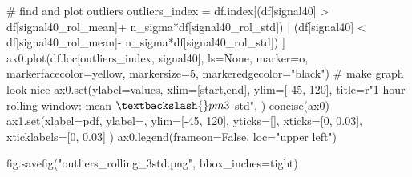 \documentclass[
  letterpaper,
  DIV=11,
  numbers=noendperiod,
  oneside]{scrreprt}
\newenvironment{Shaded}{\begin{snugshade}}{\end{snugshade}}
\newcommand{\BuiltInTok}[1]{\textcolor[rgb]{0.00,0.23,0.31}{#1}}
\newcommand{\CommentTok}[1]{\textcolor[rgb]{0.37,0.37,0.37}{#1}}
\newcommand{\DecValTok}[1]{\textcolor[rgb]{0.68,0.00,0.00}{#1}}
\newcommand{\FloatTok}[1]{\textcolor[rgb]{0.68,0.00,0.00}{#1}}
\newcommand{\NormalTok}[1]{\textcolor[rgb]{0.00,0.23,0.31}{#1}}
\newcommand{\OperatorTok}[1]{\textcolor[rgb]{0.37,0.37,0.37}{#1}}
\newcommand{\StringTok}[1]{\textcolor[rgb]{0.13,0.47,0.30}{#1}}
\newcommand{\VariableTok}[1]{\textcolor[rgb]{0.07,0.07,0.07}{#1}}
\newcommand{\VerbatimStringTok}[1]{\textcolor[rgb]{0.13,0.47,0.30}{#1}}
\begin{document}
\begin{Shaded}
\begin{Highlighting}[]
\CommentTok{\# find and plot outliers}
\NormalTok{outliers\_index }\OperatorTok{=}\NormalTok{ df.index[(df[}\StringTok{\textquotesingle{}signal40\textquotesingle{}}\NormalTok{] }\OperatorTok{\textgreater{}}\NormalTok{ df[}\StringTok{\textquotesingle{}signal40\_rol\_mean\textquotesingle{}}\NormalTok{]}\OperatorTok{+}\NormalTok{ n\_sigma}\OperatorTok{*}\NormalTok{df[}\StringTok{\textquotesingle{}signal40\_rol\_std\textquotesingle{}}\NormalTok{]) }\OperatorTok{|} 
\NormalTok{                          (df[}\StringTok{\textquotesingle{}signal40\textquotesingle{}}\NormalTok{] }\OperatorTok{\textless{}}\NormalTok{ df[}\StringTok{\textquotesingle{}signal40\_rol\_mean\textquotesingle{}}\NormalTok{]}\OperatorTok{{-}}\NormalTok{ n\_sigma}\OperatorTok{*}\NormalTok{df[}\StringTok{\textquotesingle{}signal40\_rol\_std\textquotesingle{}}\NormalTok{])}
\NormalTok{                         ]}
\NormalTok{ax0.plot(df.loc[outliers\_index, }\StringTok{\textquotesingle{}signal40\textquotesingle{}}\NormalTok{], ls}\OperatorTok{=}\StringTok{\textquotesingle{}None\textquotesingle{}}\NormalTok{,}
\NormalTok{        marker}\OperatorTok{=}\StringTok{\textquotesingle{}o\textquotesingle{}}\NormalTok{, markerfacecolor}\OperatorTok{=}\StringTok{\textquotesingle{}yellow\textquotesingle{}}\NormalTok{, markersize}\OperatorTok{=}\DecValTok{5}\NormalTok{,}
\NormalTok{        markeredgecolor}\OperatorTok{=}\StringTok{"black"}\NormalTok{)}
\CommentTok{\# make graph look nice}
\NormalTok{ax0.}\BuiltInTok{set}\NormalTok{(ylabel}\OperatorTok{=}\StringTok{\textquotesingle{}values\textquotesingle{}}\NormalTok{,}
\NormalTok{       xlim}\OperatorTok{=}\NormalTok{[start,end],}
\NormalTok{       ylim}\OperatorTok{=}\NormalTok{[}\OperatorTok{{-}}\DecValTok{45}\NormalTok{, }\DecValTok{120}\NormalTok{],}
\NormalTok{       title}\OperatorTok{=}\VerbatimStringTok{r"1{-}hour rolling window: mean $\textbackslash{}pm3$ std"}\NormalTok{,}
\NormalTok{       )}
\NormalTok{concise(ax0)}
\NormalTok{ax1.}\BuiltInTok{set}\NormalTok{(xlabel}\OperatorTok{=}\StringTok{\textquotesingle{}pdf\textquotesingle{}}\NormalTok{,}
\NormalTok{        ylabel}\OperatorTok{=}\StringTok{\textquotesingle{}\textquotesingle{}}\NormalTok{,}
\NormalTok{        ylim}\OperatorTok{=}\NormalTok{[}\OperatorTok{{-}}\DecValTok{45}\NormalTok{, }\DecValTok{120}\NormalTok{],}
\NormalTok{        yticks}\OperatorTok{=}\NormalTok{[],}
\NormalTok{        xticks}\OperatorTok{=}\NormalTok{[}\DecValTok{0}\NormalTok{, }\FloatTok{0.03}\NormalTok{],}
\NormalTok{        xticklabels}\OperatorTok{=}\NormalTok{[}\StringTok{\textquotesingle{}0\textquotesingle{}}\NormalTok{, }\StringTok{\textquotesingle{}0.03\textquotesingle{}}\NormalTok{]}
\NormalTok{        )}
\NormalTok{ax0.legend(frameon}\OperatorTok{=}\VariableTok{False}\NormalTok{, loc}\OperatorTok{=}\StringTok{"upper left"}\NormalTok{)}

\NormalTok{fig.savefig(}\StringTok{"outliers\_rolling\_3std.png"}\NormalTok{, bbox\_inches}\OperatorTok{=}\StringTok{\textquotesingle{}tight\textquotesingle{}}\NormalTok{)}
\end{Highlighting}
\end{Shaded}
\end{document}
